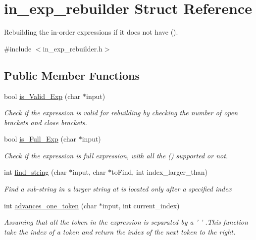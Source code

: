 \hypertarget{structin__exp__rebuilder}{\section{in\-\_\-exp\-\_\-rebuilder Struct Reference}
\label{structin__exp__rebuilder}
}


Rebuilding the in-\/order expressions if it does not have ().  




{\ttfamily \#include $<$in\-\_\-exp\-\_\-rebuilder.\-h$>$}

\subsection*{Public Member Functions}
\begin{DoxyCompactItemize}
\item 
bool \hyperlink{structin__exp__rebuilder_abfaea167217154d8ca36509ffbe06cf5}{is\-\_\-\-Valid\-\_\-\-Exp} (char $\ast$input)
\begin{DoxyCompactList}\small\item\em Check if the expression is valid for rebuilding by checking the number of open brackets and close brackets. \end{DoxyCompactList}\item 
bool \hyperlink{structin__exp__rebuilder_a7c37d43cdab0561cd430352c3e2d5edc}{is\-\_\-\-Full\-\_\-\-Exp} (char $\ast$input)
\begin{DoxyCompactList}\small\item\em Check if the expression is full expression, with all the () supported or not. \end{DoxyCompactList}\item 
int \hyperlink{structin__exp__rebuilder_a481515d16b6ab6e53d8ae68f20f059a7}{find\-\_\-string} (char $\ast$input, char $\ast$to\-Find, int index\-\_\-larger\-\_\-than)
\begin{DoxyCompactList}\small\item\em Find a sub-\/string in a larger string at is located only after a specified index\end{DoxyCompactList}\item 
int \hyperlink{structin__exp__rebuilder_a234ba48a53e618408c54c9528f1af7f6}{advances\-\_\-one\-\_\-token} (char $\ast$input, int current\-\_\-index)
\begin{DoxyCompactList}\small\item\em Assuming that all the token in the expression is separated by a ' ' .This function take the index of a token and return the index of the next token to the right. \end{DoxyCompactList}\item 

\end{DoxyCompactItemize}
